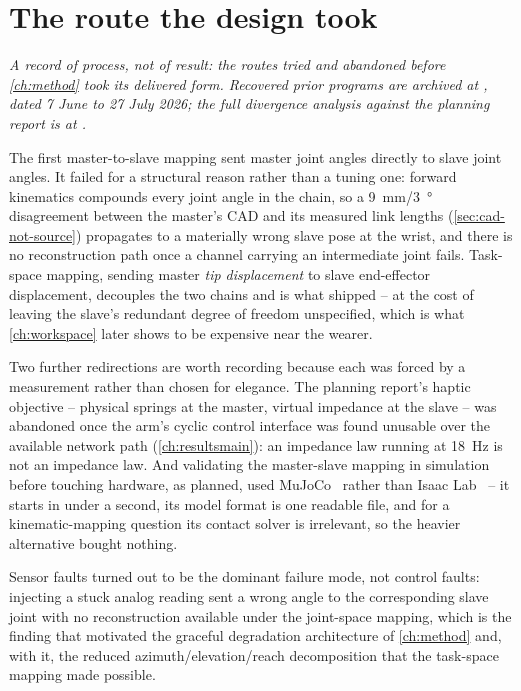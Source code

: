 \chapter{The route the design took}
\label{app:development}
\label{ch:development}

\noindent\emph{A record of process, not of result: the routes tried and
abandoned before \cref{ch:method} took its delivered form. Recovered prior
programs are archived at , dated
7 June to 27 July 2026; the full divergence analysis against the planning
report is at .}

The first master-to-slave mapping sent master joint angles directly to slave
joint angles. It failed for a structural reason rather than a tuning one:
forward kinematics compounds every joint angle in the chain, so a
\SI{9}{\milli\metre}/\SI{3}{\degree} disagreement between the master's CAD
and its measured link lengths (\cref{sec:cad-not-source}) propagates to a
materially wrong slave pose at the wrist, and there is no reconstruction
path once a channel carrying an intermediate joint fails. Task-space
mapping, sending master \emph{tip displacement} to slave end-effector
displacement, decouples the two chains and is what shipped -- at the cost of
leaving the slave's redundant degree of freedom unspecified, which is what
\cref{ch:workspace} later shows to be expensive near the wearer.

Two further redirections are worth recording because each was forced by a
measurement rather than chosen for elegance. The planning report's haptic
objective -- physical springs at the master, virtual impedance at the slave
-- was abandoned once the arm's cyclic control interface was found unusable
over the available network path (\cref{ch:resultsmain}): an impedance law
running at \SI{18}{\hertz} is not an impedance law. And validating the
master-slave mapping in simulation before touching hardware, as planned,
used MuJoCo~\cite{todorov2012mujoco} rather than Isaac
Lab~\cite{isaaclab} -- it starts in under a second, its model format is one
readable file, and for a kinematic-mapping question its contact solver is
irrelevant, so the heavier alternative bought nothing.

Sensor faults turned out to be the dominant failure mode, not control
faults: injecting a stuck analog reading sent a wrong angle to the
corresponding slave joint with no reconstruction available under the
joint-space mapping, which is the finding that motivated the graceful
degradation architecture of \cref{ch:method} and, with it, the reduced
azimuth/elevation/reach decomposition that the task-space mapping made
possible.
